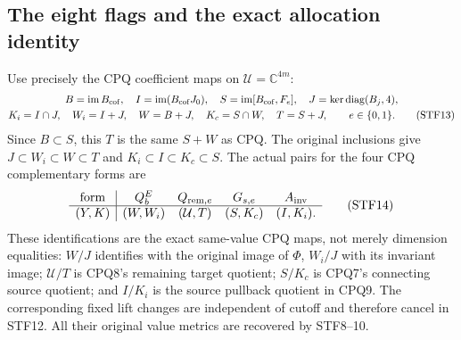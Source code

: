 \documentclass[11pt,a4paper]{article}
\begin{document}
\subsection{The eight flags and the exact allocation identity}
Use precisely the CPQ coefficient maps on $\mathcal U=\mathbb C^{4m}$:
\[
 \begin{gathered}
 B=\operatorname{im}B_{\rm cof},\quad
 I=\operatorname{im}(B_{\rm cof}J_0),\quad
 S=\operatorname{im}[B_{\rm cof},F_e],\quad
 J=\ker\operatorname{diag}(B_j,4),\\
 K_i=I\cap J,\quad W_i=I+J,\quad W=B+J,\quad
 K_c=S\cap W,\quad T=S+J,
 \qquad e\in\{0,1\}.                                    \tag{STF13}
 \end{gathered}
\]
Since $B\subset S$, this $T$ is the same $S+W$ as CPQ.
The original inclusions give
$J\subset W_i\subset W\subset T$ and
$K_i\subset I\subset K_c\subset S$.
The actual pairs for the four CPQ complementary forms are
\[
 \begin{array}{c|cccc}
 \text{form}&Q_b^E&Q_{{\rm rem},e}&G_{s,e}&A_{\rm inv}\\ \hline
 (Y,K)&(W,W_i)&(\mathcal U,T)&(S,K_c)&(I,K_i).
 \end{array}                                                   \tag{STF14}
\]
These identifications are the exact same-value CPQ maps, not merely
dimension equalities: $W/J$ identifies with the original image of
$\Phi$, $W_i/J$ with its invariant image; $\mathcal U/T$ is CPQ8's
remaining target quotient; $S/K_c$ is CPQ7's connecting source quotient;
and $I/K_i$ is the source pullback quotient in CPQ9. The corresponding
fixed lift changes are independent of cutoff and therefore cancel in
STF12. All their original value metrics are recovered by STF8--10.
\end{document}
